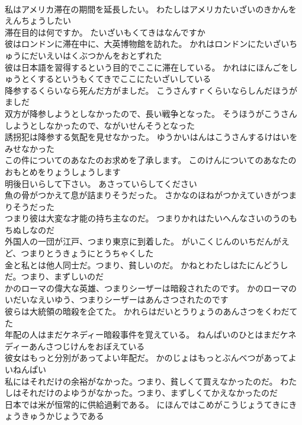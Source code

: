 \documentclass[8pt]{extreport}
\begin{document}
\begin{CJK}{UTF8}{min}
\\	私はアメリカ滞在の期間を延長したい。	わたしはアメリカたいざいのきかんをえんちょうしたい 
\\	滞在目的は何ですか。	たいざいもくてきはなんですか 
\\	彼はロンドンに滞在中に、大英博物館を訪れた。	かれはロンドンにたいざいちゅうにだいえいはくぶつかんをおとずれた 
\\	彼は日本語を習得するという目的でここに滞在している。	かれはにほんごをしゅうとくするというもくてきでここにたいざいしている 
\\	降参するくらいなら死んだ方がましだ。	こうさんすｒくらいならしんだほうがましだ 
\\	双方が降参しようとしなかったので、長い戦争となった。	そうほうがこうさんしようとしなかったので、ながいせんそうとなった 
\\	誘拐犯は降参する気配を見せなかった。	ゆうかいはんはこうさんするけはいをみせなかった 
\\	この件についてのあなたのお求めを了承します。	このけんについてのあなたのおもとめをりょうしょうします 
\\	明後日いらして下さい。	あさっていらしてください 
\\	魚の骨がつかえて息が詰まりそうだった。	さかなのほねがつかえていきがつまりそうだった 
\\	つまり彼は大変な才能の持ち主なのだ。	つまりかれはたいへんなさいのうのもちぬしなのだ 
\\	外国人の一団が江戸、つまり東京に到着した。	がいこくじんのいちだんがえど、つまりとうきょうにとうちゃくした 
\\	金と私とは他人同士だ。つまり、貧しいのだ。	かねとわたしはたにんどうしだ。つまり、まずしいのだ 
\\	かのローマの偉大な英雄、つまりシーザーは暗殺されたのです。	かのローマのいだいなえいゆう、つまりシーザーはあんさつされたのです 
\\	彼らは大統領の暗殺を企てた。	かれらはだいとうりょうのあんさつをくわだてた 
\\	年配の人はまだケネディー暗殺事件を覚えている。	ねんぱいのひとはまだケネディーあんさつじけんをおぼえている 
\\	彼女はもっと分別があってよい年配だ。	かのじょはもっとぶんべつがあってよいねんぱい 
\\	私にはそれだけの余裕がなかった。つまり、貧しくて買えなかったのだ。	わたしはそれだけのよゆうがなかった。つまり、まずしくてかえなかったのだ 
\\	日本では米が恒常的に供給過剰である。	にほんではこめがこうじょうてきにきょうきゅうかじょうである 

\end{CJK}
\end{document}
